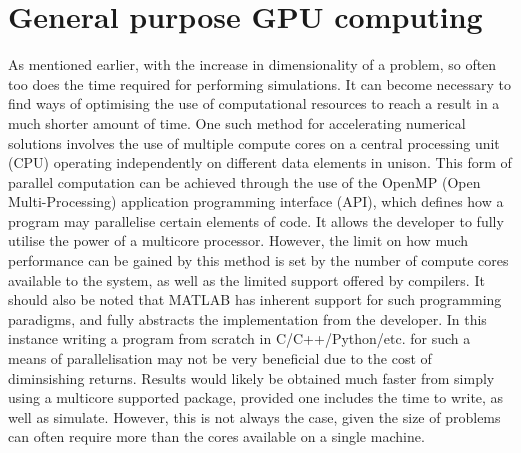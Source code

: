 \section{General purpose GPU computing}

As mentioned earlier, with the increase in dimensionality of a problem, so often too does the time required for performing simulations. It can become necessary to find ways of optimising the use of computational resources to reach a result in a much shorter amount of time. One such method for accelerating numerical solutions involves the use of multiple compute cores on a central processing unit (CPU) operating independently on different data elements in unison. This form of parallel computation can be achieved through the use of the OpenMP (Open Multi-Processing) application programming interface (API), which defines how a program may parallelise certain elements of code. It allows the developer to fully utilise the power of a multicore processor. However, the limit on how much performance can be gained by this method is set by the number of compute cores available to the system, as well as the limited support offered by compilers. It should also be noted that MATLAB has inherent support for such programming paradigms, and fully abstracts the implementation from the developer. In this instance writing a program from scratch in C/C++/Python/etc. for such a means of parallelisation may not be very beneficial due to the cost of diminsishing returns. Results would likely be obtained much faster from simply using a multicore supported package, provided one includes the time to write, as well as simulate. However, this is not always the case, given the size of problems can often require more than the cores available on a single machine.

